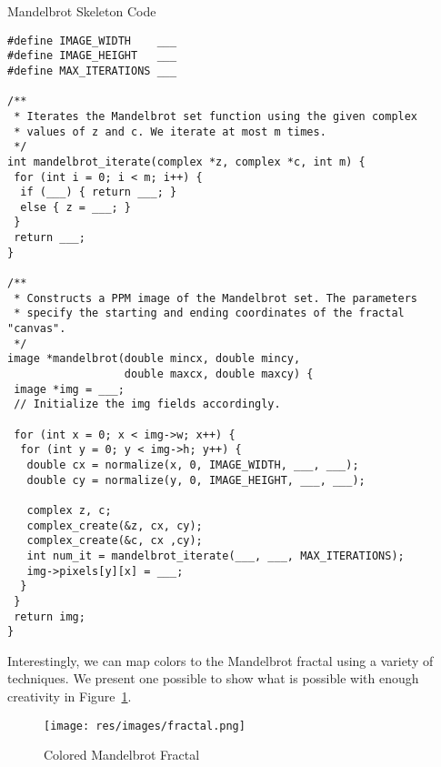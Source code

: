 
\begin{cl}[]{Mandelbrot Skeleton Code}
\begin{lstlisting}[language=MyC]
#define IMAGE_WIDTH    ___
#define IMAGE_HEIGHT   ___
#define MAX_ITERATIONS ___

/**
 * Iterates the Mandelbrot set function using the given complex 
 * values of z and c. We iterate at most m times.
 */
int mandelbrot_iterate(complex *z, complex *c, int m) { 
 for (int i = 0; i < m; i++) {
  if (___) { return ___; } 
  else { z = ___; }
 }
 return ___;
}

/**
 * Constructs a PPM image of the Mandelbrot set. The parameters 
 * specify the starting and ending coordinates of the fractal "canvas".
 */
image *mandelbrot(double mincx, double mincy, 
                  double maxcx, double maxcy) { 
 image *img = ___;
 // Initialize the img fields accordingly.

 for (int x = 0; x < img->w; x++) {
  for (int y = 0; y < img->h; y++) {
   double cx = normalize(x, 0, IMAGE_WIDTH, ___, ___);
   double cy = normalize(y, 0, IMAGE_HEIGHT, ___, ___);

   complex z, c;
   complex_create(&z, cx, cy);
   complex_create(&c, cx ,cy);
   int num_it = mandelbrot_iterate(___, ___, MAX_ITERATIONS);
   img->pixels[y][x] = ___;
  }
 }
 return img;
}
\end{lstlisting}
\end{cl}

Interestingly, we can map colors to the Mandelbrot fractal using a variety of techniques. We present one possible to show what is possible with enough creativity in Figure~\ref{fig:fractal}.

\begin{figure}[H]
\centering
\texttt{[image: res/images/fractal.png]}
\caption{Colored Mandelbrot Fractal}
\label{fig:fractal}
\end{figure}

